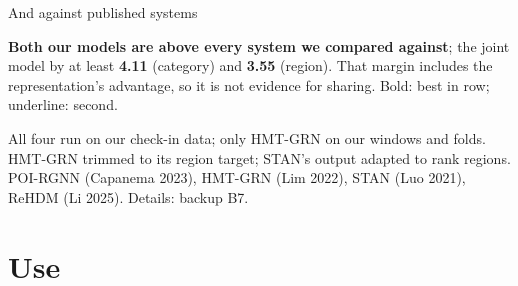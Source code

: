 \documentclass{beamer}
\newcommand{\scite}[1]{{\color{black!60}\footnotesize(#1)}}
\begin{document}
\begin{frame}{And against published systems}
    \vspace{1mm}
    {\footnotesize
    \textbf{Both our models are above every system we compared against}; the joint model by at least
    \textbf{4.11} (category) and \textbf{3.55} (region). That margin includes the representation's
    advantage, so \alert{it is not evidence for sharing}. Bold: best in row; underline: second.\par}
    \vspace{0.5mm}
    {\footnotesize\color{black!75}
    All four run on our check-in data; only HMT-GRN on our windows and folds. HMT-GRN trimmed to its
    region target; STAN's output adapted to rank regions. POI-RGNN \scite{Capanema 2023}, HMT-GRN
    \scite{Lim 2022}, STAN \scite{Luo 2021}, ReHDM \scite{Li 2025}. Details: backup B7.\par}
\end{frame}

\section{Use}
\end{document}
